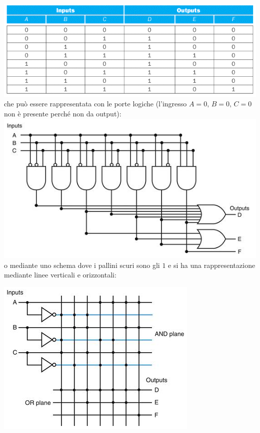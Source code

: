 \documentclass[a4paper,12pt, oneside]{book}
\begin{document}
\begin{itemize}
\includegraphics[scale=0.58]{img/pla1.png}\\
che può essere rappresentata con le porte logiche (l'ingresso $A=0,\,B=0,\,C=0$ non è presente perché non da output):\\
\includegraphics[scale=0.58]{img/pla2.png}\\
o mediante uno schema dove i pallini scuri sono gli $1$ e si ha una rappresentazione mediante linee verticali e orizzontali:
\begin{center}
\includegraphics[scale=0.565]{img/pla3.png}\end{center}
\newpage

\end{itemize}
\end{document}
